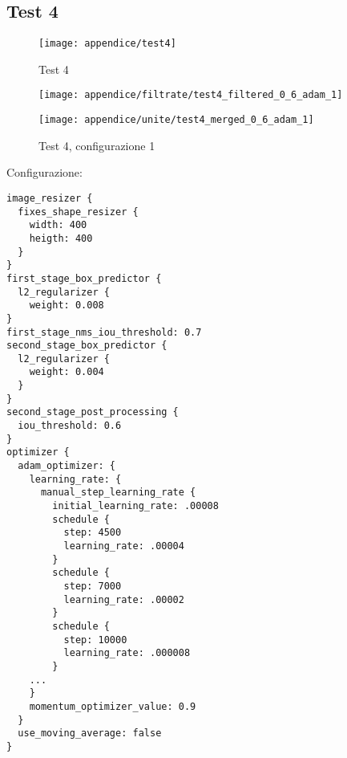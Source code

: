 \newpage
\subsection{Test 4}
\begin{figure}[!ht] 
    \centering
    \texttt{[image: appendice/test4]} 
    \caption{Test 4}
    \label{img:test-1}
\end{figure} 
\newpage



\begin{figure}[H]  
    \begin{minipage}{.5\columnwidth}  
        \centering  
        \texttt{[image: appendice/filtrate/test4\_filtered\_0\_6\_adam\_1]}  
    \end{minipage}%
    \begin{minipage}{0.5\columnwidth}  
        \centering  
        \texttt{[image: appendice/unite/test4\_merged\_0\_6\_adam\_1]}  
    \end{minipage}  
    \caption{Test 4, configurazione 1}
\end{figure}%
Configurazione:
\begin{multicols}{2}
    \begin{lstlisting}
image_resizer {
  fixes_shape_resizer {
    width: 400
    heigth: 400
  }
}
first_stage_box_predictor {
  l2_regularizer {
    weight: 0.008
}
first_stage_nms_iou_threshold: 0.7
second_stage_box_predictor {
  l2_regularizer {
    weight: 0.004
  }
}
second_stage_post_processing {
  iou_threshold: 0.6
}
optimizer {
  adam_optimizer: {
    learning_rate: {
      manual_step_learning_rate {
        initial_learning_rate: .00008
        schedule {
          step: 4500
          learning_rate: .00004
        }
        schedule {
          step: 7000
          learning_rate: .00002
        }
        schedule {
          step: 10000
          learning_rate: .000008
        }
    ...
    }
    momentum_optimizer_value: 0.9
  }
  use_moving_average: false
}
\end{lstlisting}
\end{multicols}

